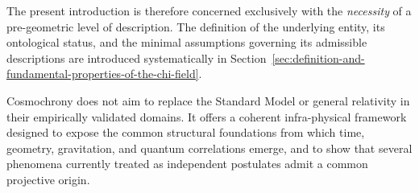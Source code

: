   The present introduction is therefore concerned exclusively with the
  \emph{necessity} of a pre-geometric level of description.
  The definition of the underlying entity, its ontological status, and the
  minimal assumptions governing its admissible descriptions are introduced
  systematically in
  Section~\ref{sec:definition-and-fundamental-properties-of-the-chi-field}.

  Cosmochrony does not aim to replace the Standard Model or general relativity in
  their empirically validated domains.
  It offers a coherent infra-physical framework designed to expose the common
  structural foundations from which time, geometry, gravitation, and quantum
  correlations emerge, and to show that several phenomena currently treated as
  independent postulates admit a common projective origin.

  
  
  
  
  
  
